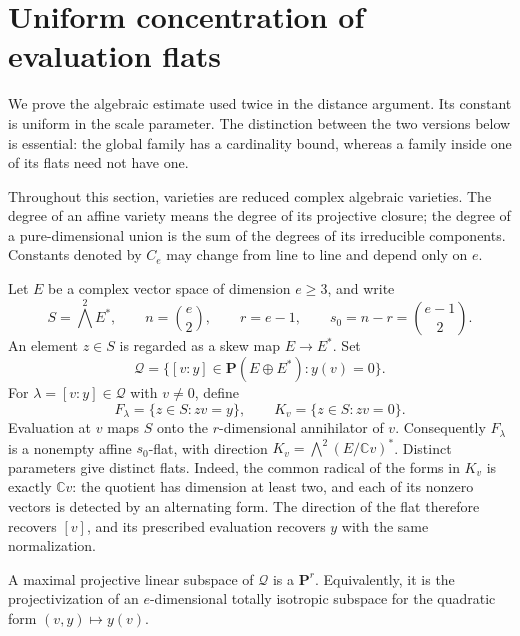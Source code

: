 \section{Uniform concentration of evaluation flats}
\label{conc:section}

We prove the algebraic estimate used twice in the distance argument.  Its
constant is uniform in the scale parameter.  The distinction between the
two versions below is essential: the global family has a cardinality
bound, whereas a family inside one of its flats need not have one.

Throughout this section, varieties are reduced complex algebraic
varieties.  The degree of an affine variety means the degree of its
projective closure; the degree of a pure-dimensional union is the sum of
the degrees of its irreducible components.  Constants denoted by $C_e$
may change from line to line and depend only on $e$.

Let $E$ be a complex vector space of dimension $e\geq3$, and write
\[
 S=\bigwedge^2E^*,\qquad n=\binom e2,\qquad
 r=e-1,\qquad s_0=n-r=\binom{e-1}{2}.
\]
An element $z\in S$ is regarded as a skew map $E\to E^*$.  Set
\[
 \mathcal Q=\{[v:y]\in\mathbf P(E\oplus E^*):y(v)=0\}.
\]
For $\lambda=[v:y]\in\mathcal Q$ with $v\ne0$, define
\begin{equation}
 F_\lambda=\{z\in S:zv=y\},\qquad
 K_v=\{z\in S:zv=0\}.
 \label{conc:flat-model}
\end{equation}
Evaluation at $v$ maps $S$ onto the $r$-dimensional annihilator of $v$.
Consequently $F_\lambda$ is a nonempty affine $s_0$-flat, with direction
$K_v=\bigwedge^2(E/\mathbb Cv)^*$.  Distinct parameters give distinct
flats.  Indeed, the common radical of the forms in $K_v$ is exactly
$\mathbb Cv$: the quotient has dimension at least two, and each of its
nonzero vectors is detected by an alternating form.  The direction of
the flat therefore recovers $[v]$, and its prescribed evaluation recovers
$y$ with the same normalization.

A maximal projective linear subspace of $\mathcal Q$ is a
$\mathbf P^r$.  Equivalently, it is the projectivization of an
$e$-dimensional totally isotropic subspace for the quadratic form
$(v,y)\mapsto y(v)$.

